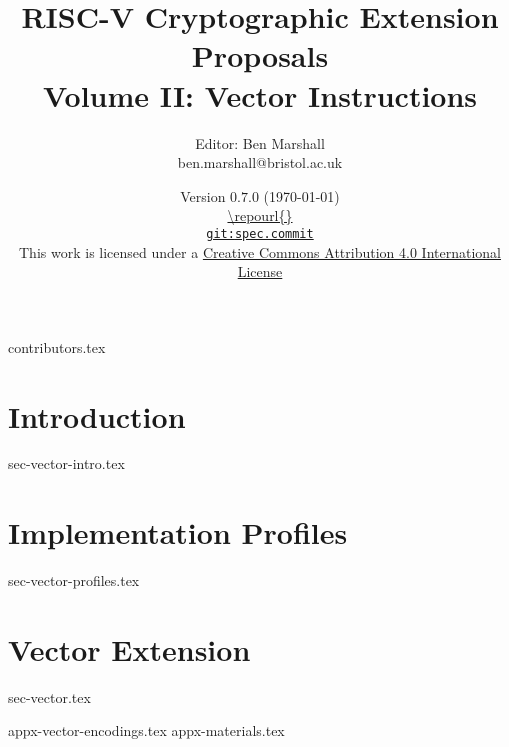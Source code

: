 \documentclass[11pt]{article}
\title{RISC-V Cryptographic Extension Proposals\\Volume II: Vector Instructions}
\author{Editor: Ben Marshall\\ben.marshall@bristol.ac.uk}
\date{Version $0.7.0$ (\today) \\
\medskip
\url{\repourl{}} \\
\href{\repourl{}}{
{\small \tt git:{spec.commit}}} \\
\bigskip
{\small
This work is licensed under a
\href{http://creativecommons.org/licenses/by/4.0/}{Creative Commons Attribution 4.0 International License}
}
}
\begin{document}

\maketitle

{contributors.tex}

\tableofcontents




\newpage
\section{Introduction}
\label{sec:intro}
{sec-vector-intro.tex}

\newpage
\section{Implementation Profiles}
\label{sec:profiles}
{sec-vector-profiles.tex}

\newpage
\section{Vector Extension}
\label{sec:vector}
{sec-vector.tex}


\newpage
\printbibliography


%
%

\newpage
\begin{appendices}
\label{sec:appendix}
{appx-vector-encodings.tex}
{appx-materials.tex}
\end{appendices}

\end{document}
